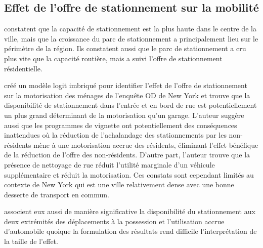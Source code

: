   \subsection{Effet de l'offre de stationnement sur la mobilité}
  \textcite{Chester:ParkingInfrastructure:2015} constatent que la capacité de stationnement est la plus haute dans le centre de la ville, mais que la croissance du parc de stationnement a principalement lieu sur le périmètre de la région.  Ils constatent aussi que le parc de stationnement a cru plus vite que la capacité routière, mais a suivi l'offre de stationnement résidentielle.\par
  \textcite{Guo:DoesResidential:2013} créé un modèle logit imbriqué pour identifier l'effet de l'offre de stationnement sur la motorisation des ménages de l'enquête OD de New York et trouve que la disponibilité de stationnement dans l'entrée et en bord de rue est potentiellement un plus grand déterminant de la motorisation qu'un garage. L'auteur suggère aussi que les programmes de vignette ont potentiellement des conséquences inattendues où la réduction de l'achalandage des stationnements par les non-résidents mène à une motorisation accrue des résidents, éliminant l'effet bénéfique de la réduction de l'offre des non-résidents. D'autre part, l'auteur trouve que la présence de nettoyage de rue réduit l'utilité marginale d'un véhicule supplémentaire et réduit la motorisation. Ces constats sont cependant limités au contexte de New York qui est une ville relativement dense avec une bonne desserte de transport en commun.\par
  \textcite{Yin:BuiltEnvironment:2018} associent eux aussi de manière significative la disponibilité du stationnement aux deux extrémités des déplacements à la possession et l'utilisation accrue d'automobile quoique la formulation des résultats rend difficile l'interprétation de la taille de l'effet.\par
